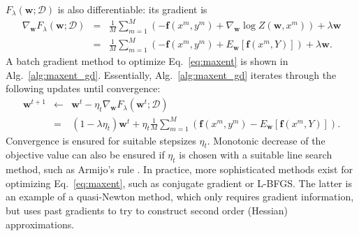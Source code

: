 $F_{\lambda}(\boldsymbol{w}; \mathcal{D})$ is also differentiable: its gradient is 
\begin{eqnarray}
\nabla_{\boldsymbol{w}}F_{\lambda}(\boldsymbol{w}; \mathcal{D}) &=& \frac{1}{M}\sum_{m=1}^M (-\boldsymbol{f}(x^m,y^m) + \nabla_{\boldsymbol{w}} \log Z(\boldsymbol{w},x^m))
+ \lambda \boldsymbol{w} \nonumber\\
&=& \frac{1}{M}\sum_{m=1}^M (-\boldsymbol{f}(x^m,y^m) + E_{\boldsymbol{w}} [\boldsymbol{f}(x^m,Y)])
+ \lambda \boldsymbol{w}. 
\end{eqnarray}
A batch gradient method to optimize Eq.~\ref{eq:maxent} is shown in Alg.~\ref{alg:maxent_gd}. Essentially, Alg.~\ref{alg:maxent_gd} iterates 
through the following updates until convergence: 
\begin{eqnarray}
\boldsymbol{w}^{t+1} &\leftarrow&  \boldsymbol{w}^{t} - \eta_t \nabla_{\boldsymbol{w}}F_{\lambda}(\boldsymbol{w}^{t}; \mathcal{D})\nonumber\\
&=&  (1-\lambda \eta_t) \boldsymbol{w}^{t} + \eta_t \frac{1}{M} \sum_{m=1}^M \left( \boldsymbol{f}(x^m,y^m) - E_{\boldsymbol{w}}[\boldsymbol{f}(x^m,Y)]\right).
\end{eqnarray}
Convergence is ensured for suitable stepsizes $\eta_t$. Monotonic decrease of the objective value can also be ensured if $\eta_t$ is chosen 
with a suitable line search method, such as Armijo's rule \citep{Nocedal1999}. 
In practice, more sophisticated methods exist for optimizing Eq.~\ref{eq:maxent}, such as conjugate gradient or L-BFGS. The latter is an 
example of a quasi-Newton method, which only requires gradient information, but uses past 
gradients to try to 
construct second order (Hessian) approximations. 

